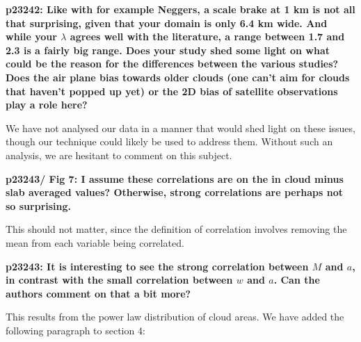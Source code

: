 \documentclass[12pt]{article}
\begin{document}
\vspace{5mm}

\textbf{p23242: Like with for example Neggers, a scale brake at 1 km is not all 
that surprising, given that your domain is only 6.4 km wide. And while your 
$\lambda$ agrees well with the literature, a range between 1.7 and 2.3 is a 
fairly big range. Does your study shed some light on what could be the reason 
for the differences between the various studies? Does the air plane bias 
towards older clouds (one can’t aim for clouds that haven’t popped up yet) or 
the 2D bias of satellite observations play a role here?}

\vspace{5mm}

We have not analysed our data in a manner that would shed light on these issues,
though our technique could likely be used to address them.  Without such an 
analysis, we are hesitant to comment on this subject.

\vspace{5mm}

\textbf{p23243/ Fig 7: I assume these correlations are on the in cloud minus 
slab averaged values? Otherwise, strong correlations are perhaps not so 
surprising.}

\vspace{5mm}

This should not matter, since the definition of correlation involves removing 
the mean from each variable being correlated.

\vspace{5mm}

\textbf{p23243: It is interesting to see the strong correlation between $M$ 
and $a$, in contrast with the small correlation between $w$ and $a$. Can the 
authors comment on that a bit more?}

\vspace{5mm}

This results from the power law distribution of cloud areas.  We have added the
following paragraph to section 4: 
\end{document}
